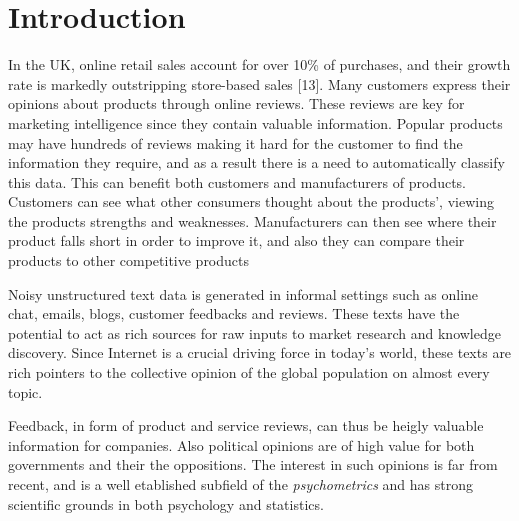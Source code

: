 
\chapter{Introduction}


In the UK, online retail sales account for over 10\% of purchases, and their growth rate is markedly outstripping store-based sales [13]. Many customers express their opinions about products through online reviews. These reviews are key for marketing intelligence since they contain valuable information. Popular products may have hundreds of reviews making it hard for the customer to find the information they require, and as a result there is a need to automatically classify this data. This can benefit both customers and manufacturers of products. Customers can see what other consumers thought about the products’, viewing the products strengths and weaknesses. Manufacturers can then see where their product falls short in order to improve it, and also they can compare their products to other competitive products

Noisy unstructured text data is generated in informal settings such as online chat, emails, blogs, customer feedbacks and reviews. These texts have the potential to act as rich sources for raw inputs to market research and knowledge discovery. Since Internet is a crucial driving force in today’s world, these texts are rich pointers to the collective opinion of the global population on almost every topic.


Feedback, in form of product and service reviews, can thus be heigly valuable information for companies. Also political opinions are of high value for both governments and their the oppositions. The interest in such opinions is far from recent, and is a well etablished subfield of the \emph{psychometrics} and has strong scientific grounds in both psychology and statistics. 


\vspace{8em}


